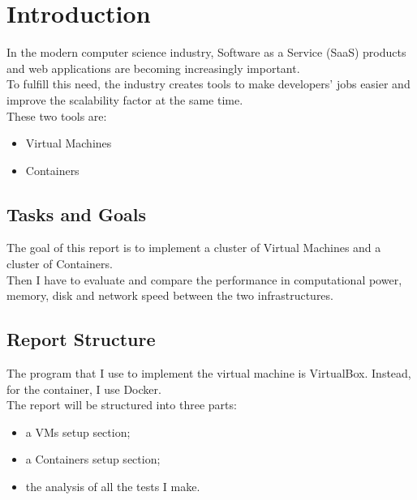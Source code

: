\chapter{Introduction}

In the modern computer science industry, Software as a Service (SaaS) products and web applications are becoming increasingly important. \\
To fulfill this need, the industry creates tools to make developers' jobs easier and improve the scalability factor at the same time. \\
These two tools are:

\begin{itemize}
    \item Virtual Machines
    \item Containers
\end{itemize}

\thispagestyle{fancy}

\section{Tasks and Goals}
The goal of this report is to implement a cluster of Virtual Machines and a cluster of Containers. \\
Then I have to evaluate and compare the performance in computational power, memory, disk and network speed between the two infrastructures.

\section{Report Structure}
The program that I use to implement the virtual machine is VirtualBox. Instead, for the container, I use Docker. \\
The report will be structured into three parts:

\begin{itemize}
    \item a VMs setup section;
    \item a Containers setup section;
    \item the analysis of all the tests I make.
\end{itemize}

